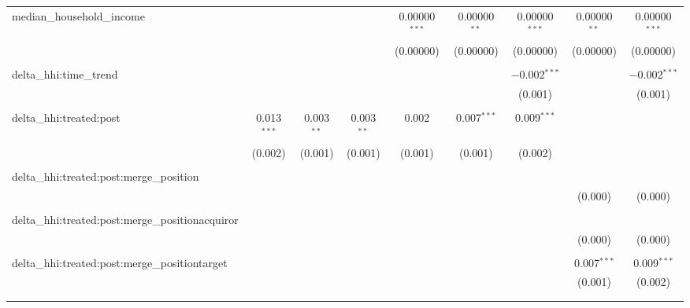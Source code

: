 \begin{table}[H]
{\begin{tabular}{@{\extracolsep{5pt}}lcccccccc}
  median\_household\_income &  &  &  & 0.00000$^{***}$ & 0.00000$^{**}$ & 0.00000$^{***}$ & 0.00000$^{**}$ & 0.00000$^{***}$ \\  

   &  &  &  & (0.00000) & (0.00000) & (0.00000) & (0.00000) & (0.00000) \\  

   & & & & & & & & \\  

  delta\_hhi:time\_trend &  &  &  &  &  & $-$0.002$^{***}$ &  & $-$0.002$^{***}$ \\  

   &  &  &  &  &  & (0.001) &  & (0.001) \\  

   & & & & & & & & \\  

  delta\_hhi:treated:post & 0.013$^{***}$ & 0.003$^{**}$ & 0.003$^{**}$ & 0.002 & 0.007$^{***}$ & 0.009$^{***}$ &  &  \\  

   & (0.002) & (0.001) & (0.001) & (0.001) & (0.001) & (0.002) &  &  \\  

   & & & & & & & & \\  

  delta\_hhi:treated:post:merge\_position &  &  &  &  &  &  &  &  \\  

   &  &  &  &  &  &  & (0.000) & (0.000) \\  

   & & & & & & & & \\  

  delta\_hhi:treated:post:merge\_positionacquiror &  &  &  &  &  &  &  &  \\  

   &  &  &  &  &  &  & (0.000) & (0.000) \\  

   & & & & & & & & \\  

  delta\_hhi:treated:post:merge\_positiontarget &  &  &  &  &  &  & 0.007$^{***}$ & 0.009$^{***}$ \\  

   &  &  &  &  &  &  & (0.001) & (0.002) \\  

   & & & & & & & & \\  

 \hline \\[-1.8ex]  


\end{tabular}}
\end{table}
